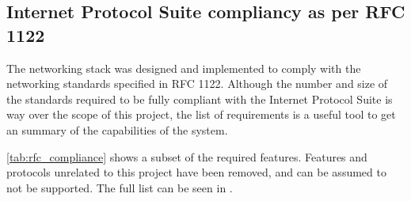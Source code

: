 \subsection{Internet Protocol Suite compliancy as per RFC 1122}
The networking stack was designed and implemented to comply with the networking
standards specified in RFC 1122. Although the number and size of the standards
required to be fully compliant with the Internet Protocol Suite is way over the
scope of this project, the list of requirements is a useful tool to get an
summary of the capabilities of the system.

\autoref{tab:rfc_compliance} shows a subset of the required features.
Features and protocols unrelated to this project have been removed, and can be
assumed to not be supported. The full list can be seen in \cite[Section 3.5,
Page 72]{RFC1122}.

